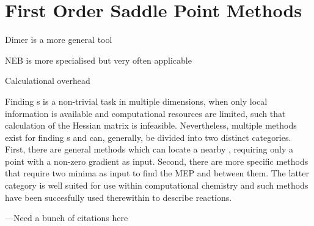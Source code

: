 \section{First Order Saddle Point Methods}
\label{sec:saddle-point-methods}

\bit
\item Dimer is a more general tool
\item NEB is more specialised but very often applicable
\item Calculational overhead
\eit

Finding \sap{}s is a non-trivial task in multiple dimensions, when only local information is available and computational resources are limited, such that calculation of the Hessian matrix is infeasible.
Nevertheless, multiple methods exist for finding s and can, generally, be divided into two distinct categories.
First, there are general methods which can locate a nearby , requiring only a point with a non-zero gradient as input.
Second, there are more specific methods that require two minima as input to find the MEP and  between them.
The latter category is well suited for use within computational chemistry and such methods have been succesfully used therewithin to describe reactions.

---Need a bunch of citations here

\incomplete




